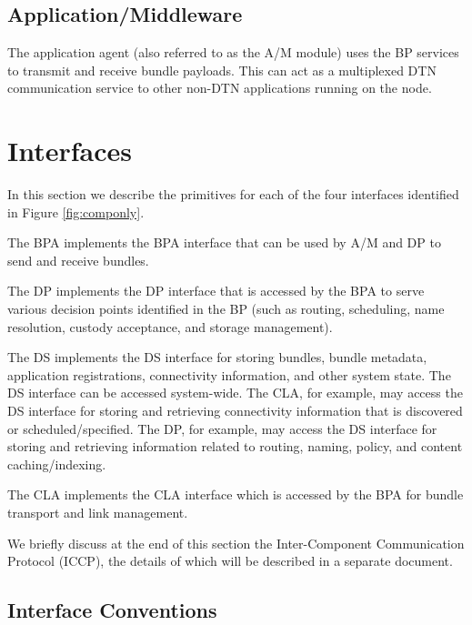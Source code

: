 \documentclass[11pt]{article}
\begin{document}

\subsection{Application/Middleware}
\label{sec:am}

The application agent (also referred to as the A/M module) uses the BP services
to transmit and receive bundle payloads. This can act as a multiplexed DTN
communication service to other non-DTN applications running on the node.

\newpage
\section{Interfaces}
\label{sec:interfaces}

In this section we describe the primitives for each of the four interfaces 
identified in Figure \ref{fig:componly}.  

The BPA implements the BPA interface that can be used by A/M and DP to send and
receive bundles.  

The DP implements the DP interface that is accessed by the BPA to serve various
decision points identified in the BP (such as routing, scheduling, name
resolution, custody acceptance, and storage management).

The DS implements the DS interface for storing bundles, bundle metadata,
application registrations, connectivity information, and other system state.
The DS interface can be accessed system-wide.  The CLA, for example, may access
the DS interface for storing and retrieving connectivity information that is
discovered or scheduled/specified.  The DP, for example, may access the DS
interface for storing and retrieving information related to routing, naming,
policy, and content caching/indexing.

The CLA implements the CLA interface which is accessed by the BPA for 
bundle transport and link management.

We briefly discuss at the end of this section the Inter-Component 
Communication Protocol (ICCP), the details of which will be described 
in a separate document.

\subsection{Interface Conventions}
\end{document}
